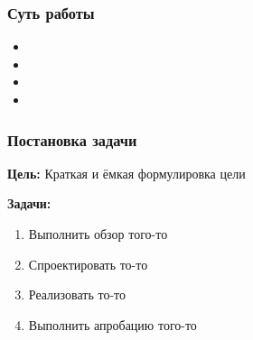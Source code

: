 \documentclass{vkr-slides-style}
\begin{document}
\makeslidestitle



\begin{frame}  
    \frametitle{Суть работы}
    \begin{itemize}
        \item 
        \item 
        \item 
        \item 
    \end{itemize}
\end{frame}

\begin{frame}  
    \frametitle{Постановка задачи}
    \textbf{Цель:} Краткая и ёмкая формулировка цели

    \vspace{5mm}
    \textbf{Задачи:}
    \begin{enumerate}
        \item Выполнить обзор того-то
        \item Спроектировать то-то
        \item Реализовать то-то
        \item Выполнить апробацию того-то
    \end{enumerate}
\end{frame}
\end{document}
